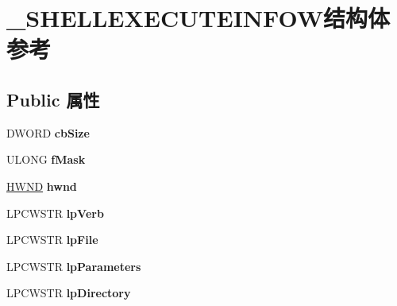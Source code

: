 \hypertarget{struct___s_h_e_l_l_e_x_e_c_u_t_e_i_n_f_o_w}{}\section{\+\_\+\+S\+H\+E\+L\+L\+E\+X\+E\+C\+U\+T\+E\+I\+N\+F\+O\+W结构体 参考}
\label{struct___s_h_e_l_l_e_x_e_c_u_t_e_i_n_f_o_w}
\subsection*{Public 属性}
\begin{DoxyCompactItemize}
\item 
\mbox{\label{struct___s_h_e_l_l_e_x_e_c_u_t_e_i_n_f_o_w_a6d3960e30d72ca91c8060c4f93ddbbc7}} 
D\+W\+O\+RD {\bfseries cb\+Size}
\item 
\mbox{\label{struct___s_h_e_l_l_e_x_e_c_u_t_e_i_n_f_o_w_aed7ff5c4d27cfa21da913cd7f5065cf5}} 
U\+L\+O\+NG {\bfseries f\+Mask}
\item 
\mbox{\label{struct___s_h_e_l_l_e_x_e_c_u_t_e_i_n_f_o_w_a1c6b21b20cbd5bfba6361cd1c4e32697}} 
\hyperlink{interfacevoid}{H\+W\+ND} {\bfseries hwnd}
\item 
\mbox{\label{struct___s_h_e_l_l_e_x_e_c_u_t_e_i_n_f_o_w_a2fe30378b4ec3d7e40257c49d32bdd3e}} 
L\+P\+C\+W\+S\+TR {\bfseries lp\+Verb}
\item 
\mbox{\label{struct___s_h_e_l_l_e_x_e_c_u_t_e_i_n_f_o_w_ad8fce08e4f40ca516fb25abf68afa34d}} 
L\+P\+C\+W\+S\+TR {\bfseries lp\+File}
\item 
\mbox{\label{struct___s_h_e_l_l_e_x_e_c_u_t_e_i_n_f_o_w_aff6f96a396956e7216581223cbcce388}} 
L\+P\+C\+W\+S\+TR {\bfseries lp\+Parameters}
\item 
\mbox{\label{struct___s_h_e_l_l_e_x_e_c_u_t_e_i_n_f_o_w_a22ea3075e8563f38d6e0dd5bf25ffcde}} 
L\+P\+C\+W\+S\+TR {\bfseries lp\+Directory}

\end{DoxyCompactItemize}
